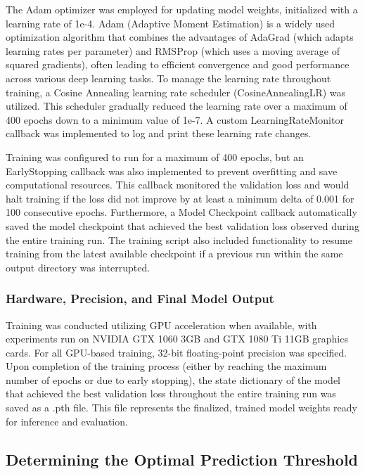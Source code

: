 \documentclass{article}
\begin{document}
The Adam optimizer was employed for updating model weights, initialized with a learning rate of 1e-4. Adam (Adaptive Moment Estimation) is a widely used optimization algorithm that combines the advantages of AdaGrad (which adapts learning rates per parameter) and RMSProp (which uses a moving average of squared gradients), often leading to efficient convergence and good performance across various deep learning tasks. To manage the learning rate throughout training, a Cosine Annealing learning rate scheduler (CosineAnnealingLR) was utilized. This scheduler gradually reduced the learning rate over a maximum of 400 epochs down to a minimum value of 1e-7. A custom LearningRateMonitor callback was implemented to log and print these learning rate changes.

Training was configured to run for a maximum of 400 epochs, but an EarlyStopping callback was also implemented to prevent overfitting and save computational resources. This callback monitored the validation loss and would halt training if the loss did not improve by at least a minimum delta of 0.001 for 100 consecutive epochs. Furthermore, a Model Checkpoint callback automatically saved the model checkpoint that achieved the best validation loss observed during the entire training run. The training script also included functionality to resume training from the latest available checkpoint if a previous run within the same output directory was interrupted.

\subsubsection{Hardware, Precision, and Final Model Output}

Training was conducted utilizing GPU acceleration when available, with experiments run on NVIDIA GTX 1060 3GB and GTX 1080 Ti 11GB graphics cards. For all GPU-based training, 32-bit floating-point precision was specified. Upon completion of the training process (either by reaching the maximum number of epochs or due to early stopping), the state dictionary of the model that achieved the best validation loss throughout the entire training run was saved as a .pth file. This file represents the finalized, trained model weights ready for inference and evaluation.

\subsection{Determining the Optimal Prediction Threshold}
\end{document}
